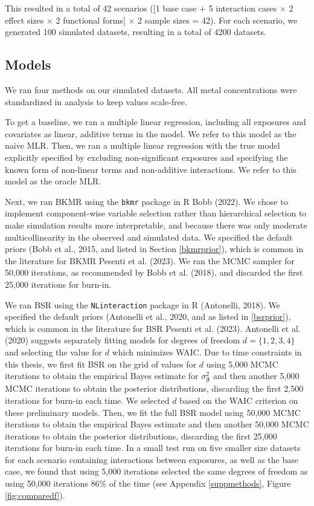 \documentclass[12pt, twoside]{amherstthesis}
\begin{document}
This resulted in a total of 42 scenarios ({[}1 base case + 5 interaction cases \(\times\) 2 effect sizes \(\times\) 2 functional forms{]} \(\times\) 2 sample sizes = 42). For each scenario, we generated 100 simulated datasets, resulting in a total of 4200 datasets.

\hypertarget{models}{%
\subsection{Models}\label{models}}

We ran four methods on our simulated datasets. All metal concentrations were standardized in analysis to keep values scale-free.

To get a baseline, we ran a multiple linear regression, including all exposures and covariates as linear, additive terms in the model. We refer to this model as the naive MLR. Then, we ran a multiple linear regression with the true model explicitly specified by excluding non-significant exposures and specifying the known form of non-linear terms and non-additive interactions. We refer to this model as the oracle MLR.

Next, we ran BKMR using the \texttt{bkmr} package in R Bobb (2022). We chose to implement component-wise variable selection rather than hierarchical selection to make simulation results more interpretable, and because there was only moderate multicollinearity in the observed and simulated data. We specified the default priors (Bobb et al., 2015, and listed in Section \ref{bkmrprior}), which is common in the literature for BKMR Pesenti et al. (2023). We ran the MCMC sampler for 50,000 iterations, as recommended by Bobb et al. (2018), and discarded the first 25,000 iterations for burn-in.

We ran BSR using the \texttt{NLinteraction} package in R (Antonelli, 2018). We specified the default priors (Antonelli et al., 2020, and as listed in \ref{bsrprior}), which is common in the literature for BSR Pesenti et al. (2023). Antonelli et al. (2020) suggests separately fitting models for degrees of freedom \(d=\{1, 2, 3, 4\}\) and selecting the value for \(d\) which minimizes WAIC. Due to time constraints in this thesis, we first fit BSR on the grid of values for \(d\) using 5,000 MCMC iterations to obtain the empirical Bayes estimate for \(\sigma^2_{\boldsymbol\beta}\) and then another 5,000 MCMC iterations to obtain the posterior distributions, discarding the first 2,500 iterations for burn-in each time. We selected \(d\) based on the WAIC criterion on these preliminary models. Then, we fit the full BSR model using 50,000 MCMC iterations to obtain the empirical Bayes estimate and then another 50,000 MCMC iterations to obtain the posterior distributions, discarding the first 25,000 iterations for burn-in each time. In a small test run on five smaller size datasets for each scenario containing interactions between exposures, as well as the base case, we found that using 5,000 iterations selected the same degrees of freedom as using 50,000 iterations 86\% of the time (see Appendix \ref{suppmethods}, Figure \ref{fig:comparedf}).
\end{document}
